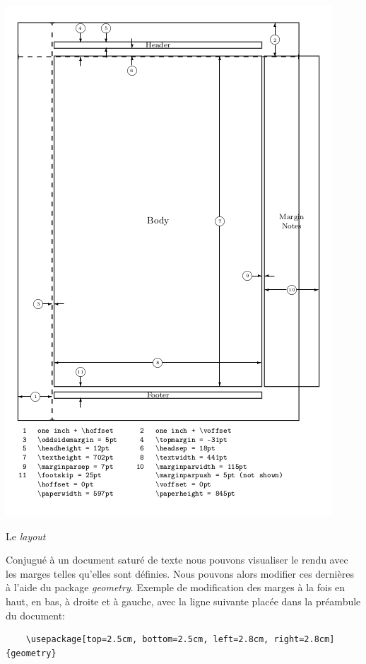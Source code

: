 \begin{table}[h]
\begin{center}
\includegraphics[scale=0.8]{IMG/layout.png}
\caption{Le \textit{layout}}
\end{center}
\end{table}
\medskip

Conjugué à un document saturé de texte nous pouvons visualiser le rendu avec les marges telles qu'elles sont définies. Nous pouvons alors modifier ces dernières à l'aide du package \textit{geometry}. Exemple de modification des marges à la fois en haut, en bas, à droite et à gauche, avec la ligne suivante placée dans la préambule du document:
\begin{verbatim}
    \usepackage[top=2.5cm, bottom=2.5cm, left=2.8cm, right=2.8cm]{geometry}
\end{verbatim}
\medskip

